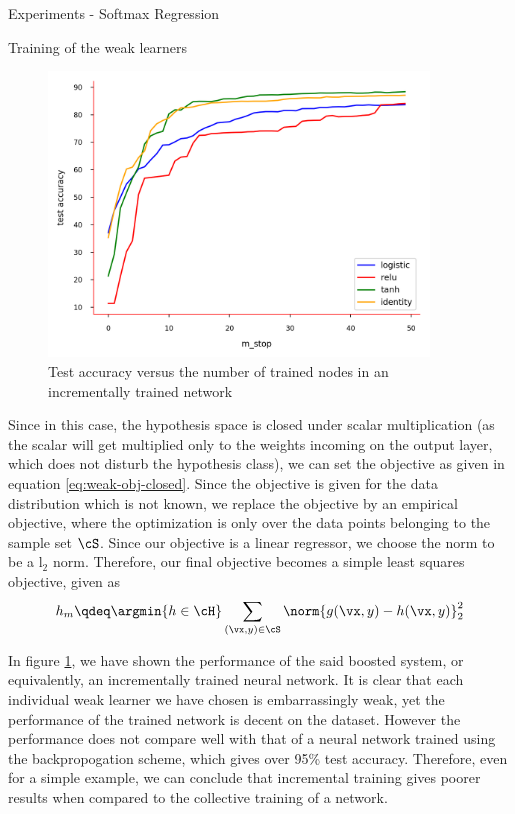 \documentclass{article}
\begin{document}
\begin{psection}{Experiments - Softmax Regression}
\begin{psubsection}{Training of the weak learners}
		\begin{figure}[h!]
			\centering
			\includegraphics[width=0.9\textwidth]{includes/boosting-comparison-plot.png}
			\caption{Test accuracy versus the number of trained nodes in an incrementally trained network}
			\label{fig:boosting-comp-plot}
		\end{figure}

		Since in this case, the hypothesis space is closed under scalar multiplication (as the scalar will get multiplied only to the weights incoming on the output layer, which does not disturb the hypothesis class), we can set the objective as given in equation \ref{eq:weak-obj-closed}. Since the objective is given for the data distribution which is not known, we replace the objective by an empirical objective, where the optimization is only over the data points belonging to the sample set $\cS$. Since our objective is a linear regressor, we choose the norm to be a l$_2$ norm. Therefore, our final objective becomes a simple least squares objective, given as
		\begin{align*}
			h_m \qdeq \argmin{h \in \cH} \sum_{(\vx, y) \in \cS} \norm{g(\vx, y) - h(\vx, y)}_2^2
		\end{align*}

		In figure \ref{fig:boosting-comp-plot}, we have shown the performance of the said boosted system, or equivalently, an incrementally trained neural network. It is clear that each individual weak learner we have chosen is embarrassingly weak, yet the performance of the trained network is decent on the dataset. However the performance does not compare well with that of a neural network trained using the backpropogation scheme, which gives over 95\% test accuracy. Therefore, even for a simple example, we can conclude that incremental training gives poorer results when compared to the collective training of a network.


\end{psubsection}
\end{psection}
\end{document}

